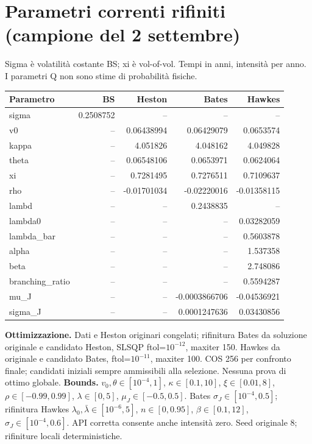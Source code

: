 \documentclass[10pt,a4paper]{article}
\begin{document}
\section{Parametri correnti rifiniti (campione del 2 settembre)}
Sigma è volatilità costante BS; xi è vol-of-vol. Tempi in anni, intensità per anno. I parametri Q non sono stime di probabilità fisiche.
\begin{center}\small\begin{tabular}{lrrrr}\toprule
Parametro & BS & Heston & Bates & Hawkes\\\midrule
sigma & 0.2508752 & -- & -- & -- \\
v0 & -- & 0.06438994 & 0.06429079 & 0.0653574 \\
kappa & -- & 4.051826 & 4.048162 & 4.049828 \\
theta & -- & 0.06548106 & 0.0653971 & 0.0624064 \\
xi & -- & 0.7281495 & 0.7276511 & 0.7109637 \\
rho & -- & -0.01701034 & -0.02220016 & -0.01358115 \\
lambd & -- & -- & 0.2438835 & -- \\
lambda0 & -- & -- & -- & 0.03282059 \\
lambda\_bar & -- & -- & -- & 0.5603878 \\
alpha & -- & -- & -- & 1.537358 \\
beta & -- & -- & -- & 2.748086 \\
branching\_ratio & -- & -- & -- & 0.5594287 \\
mu\_J & -- & -- & -0.0003866706 & -0.04536921 \\
sigma\_J & -- & -- & 0.0001247636 & 0.03430856 \\
\bottomrule\end{tabular}\end{center}
\textbf{Ottimizzazione.} Dati e Heston originari congelati; rifinitura Bates da soluzione originale e candidato Heston, SLSQP ftol=$10^{-12}$, maxiter 150. Hawkes da originale e candidato Bates, ftol=$10^{-11}$, maxiter 100. COS 256 per confronto finale; candidati iniziali sempre ammissibili alla selezione. Nessuna prova di ottimo globale.
\textbf{Bounds.} $v_0,\theta\in[10^{-4},1]$, $\kappa\in[0.1,10]$, $\xi\in[0.01,8]$, $\rho\in[-0.99,0.99]$, $\lambda\in[0,5]$, $\mu_J\in[-0.5,0.5]$. Bates $\sigma_J\in[10^{-4},0.5]$; rifinitura Hawkes $\lambda_0,\bar\lambda\in[10^{-6},5]$, $n\in[0,0.95]$, $\beta\in[0.1,12]$, $\sigma_J\in[10^{-4},0.6]$. API corretta consente anche intensità zero. Seed originale 8; rifiniture locali deterministiche.
\end{document}
